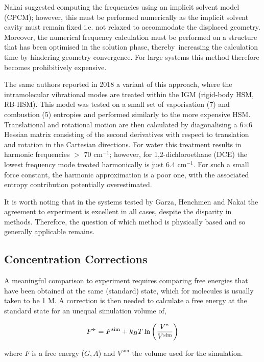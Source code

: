 \documentclass[../main.tex]{subfiles}
\begin{document}
Nakai suggested computing the frequencies using an implicit solvent model (CPCM); however, this must be performed numerically as the implicit solvent cavity must remain fixed i.e. not relaxed to accommodate the displaced geometry. Moreover, the numerical frequency calculation must be performed on a structure that has been optimised in the solution phase, thereby increasing the calculation time by hindering geometry convergence. For large systems this method therefore becomes prohibitively expensive.


The same authors reported in 2018 a variant of this approach,\cite{Tarumi2018} where the intramolecular vibrational modes are treated within the IGM (rigid-body HSM, RB-HSM). This model was tested on a small set of vaporisation (7) and combustion (5) entropies and performed similarly to the more expensive HSM. Translational and rotational motion are then calculated by diagonalising a 6$\times$6 Hessian matrix consisting of the second derivatives with respect to translation and rotation in the Cartesian directions. For water this treatment results in harmonic frequencies $>$ 70 cm$^{-1}$; however, for 1,2-dichloroethane (DCE) the lowest frequency mode treated harmonically is just 6.4 cm$^{-1}$. For such a small force constant, the harmonic approximation is a poor one, with the associated entropy contribution potentially overestimated.

It is worth noting that in the systems tested by Garza, Henchmen and Nakai the agreement to experiment is excellent in all cases, despite the disparity in methods. Therefore, the question of which method is physically based and so generally applicable remains.

\subsection{Concentration Corrections}

A meaningful comparison to experiment requires comparing free energies that have been obtained at the same (standard) state, which for molecules is usually taken to be 1 M. A correction is then needed to calculate a free energy at the standard state for an unequal simulation volume of,\cite{General2010} 

\begin{equation}
	F^{{\circ\kern-0.495em-}} = F^\text{sim} + k_BT \ln\left(\frac{V^{\circ\kern-0.495em-}}{V^\text{sim}}\right)
\end{equation}

where $F$ is a free energy ($G, A$) and $V^\text{sim}$ the volume used for the simulation. 
\end{document}

